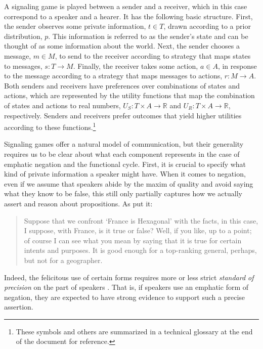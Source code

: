 \documentclass[linguex]{sp}
\theoremstyle{definition} \newtheorem{definition}{Definition}
\begin{document}
A signaling game is played between a sender and a receiver, which in this case correspond to a speaker and a hearer. It has the following basic structure. First, the sender observes some private information, $t \in T$, drawn according to a prior distribution, $p$. This information is referred to as the sender's state and can be thought of as some information about the world. Next, the sender chooses a message, $m \in M$, to send to the receiver according to strategy that maps states to messages, $s : T \rightarrow M$. Finally, the receiver takes some action, $a \in A$, in response to the message according to a strategy that maps messages to actions, $r : M \rightarrow A$. Both senders and receivers have preferences over combinations of states and actions, which are represented by the utility functions that map the combination of states and actions to real numbers, $U_S : T \times A \rightarrow \mathbb{R}$ and  $U_R : T \times A \rightarrow \mathbb{R}$, respectively. Senders and receivers prefer outcomes that yield higher utilities according to these functions.\footnote{These symbols and others are summarized in a technical glossary at the end of the document for reference.}

Signaling games offer a natural model of communication,  but their generality requires us to be clear about what each component represents in the case of emphatic negation and the functional cycle. First, it is crucial to specify what kind of private information a speaker might have. When it comes to negation, even if we assume that speakers abide by the maxim of quality and avoid saying what they know to be false, this still only partially captures how we actually assert and reason about propositions. As \citet[142]{austin1962} put it:

\begin{quotation}
Suppose that we confront `France is Hexagonal' with the facts, in this case, I suppose, with France, is it true or false? Well, if you like, up to a point; of course I can see what you mean by saying that it is true for certain intents and purposes. It is good enough for a top-ranking general, perhaps, but not for a geographer.
\end{quotation}
Indeed, the felicitous use of certain forms requires more or less strict \emph{standard of precision}  on the part of speakers \citep{lewis:1979,landman1991,krifka1995polarity}. That is, if speakers use an emphatic form of negation, they are expected to have strong evidence to support such a precise assertion. 
\end{document}

